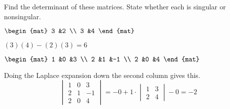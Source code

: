 \documentclass[11pt,answers]{examjh}
\begin{document}
\begin{questions}
\question
Find the determinant of these matrices.
State whether each is singular or nonsingular.
\begin{parts}
\item $
\begin{mat}
3 &2 \\
3 &4
\end{mat}
$
\begin{solution}[0.5in]
$(3)(4)-(2)(3)=6$
\end{solution}

\item
$
\begin{mat}
1 &0 &3  \\
2 &1 &-1 \\
2 &0 &4
\end{mat}
$
\begin{solution}[2in]
Doing the Laplace expansion down the second column gives this.
\begin{equation*}
\begin{vmatrix}
1 &0 &3  \\
2 &1 &-1 \\
2 &0 &4
\end{vmatrix}
=-0
+1\cdot
\begin{vmatrix}
1 &3 \\
2 &4
\end{vmatrix}
-0
=-2
\end{equation*}
\end{solution}
\end{parts}





\end{questions}
\end{document}

